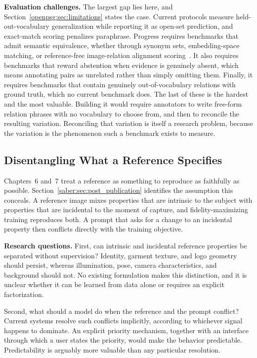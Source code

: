 \noindent \textbf{Evaluation challenges.}
The largest gap lies here, and Section~\ref{openpsg:sec:limitations} states the case. Current protocols measure held-out-vocabulary generalization while reporting it as open-set prediction, and exact-match scoring penalizes paraphrase. Progress requires benchmarks that admit semantic equivalence, whether through synonym sets, embedding-space matching, or reference-free image-relation alignment scoring~\citep{neau2025measuring}. It also requires benchmarks that reward abstention when evidence is genuinely absent, which means annotating pairs as unrelated rather than simply omitting them. Finally, it requires benchmarks that contain genuinely out-of-vocabulary relations with ground truth, which no current benchmark does. The last of these is the hardest and the most valuable. Building it would require annotators to write free-form relation phrases with no vocabulary to choose from, and then to reconcile the resulting variation. Reconciling that variation is itself a research problem, because the variation is the phenomenon such a benchmark exists to measure.

\subsection{Disentangling What a Reference Specifies}
\label{sec:future_reference}
Chapters~6 and~7 treat a reference as something to reproduce as faithfully as possible. Section~\ref{saber:sec:post_publication} identifies the assumption this conceals. A reference image mixes properties that are intrinsic to the subject with properties that are incidental to the moment of capture, and fidelity-maximizing training reproduces both. A prompt that asks for a change to an incidental property then conflicts directly with the training objective.

\noindent \textbf{Research questions.}
First, can intrinsic and incidental reference properties be separated without supervision? Identity, garment texture, and logo geometry should persist, whereas illumination, pose, camera characteristics, and background should not. No existing formulation makes this distinction, and it is unclear whether it can be learned from data alone or requires an explicit factorization.

Second, what should a model do when the reference and the prompt conflict? Current systems resolve such conflicts implicitly, according to whichever signal happens to dominate. An explicit priority mechanism, together with an interface through which a user states the priority, would make the behavior predictable. Predictability is arguably more valuable than any particular resolution.

